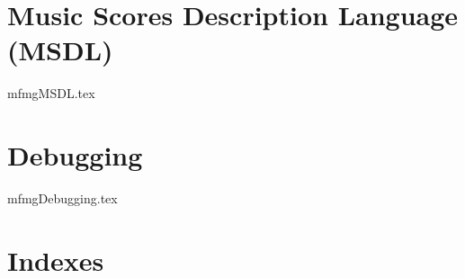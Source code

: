 \documentclass[11pt,a4paper]{report}
\begin{document}
\part{Music Scores Description Language (MSDL)}

{mfmgMSDL.tex}


\part{Debugging}

{mfmgDebugging.tex}



\part{Indexes}


\useListsPagesHeadersAndFooters

\printindex[Files]

\printindex[Types]
\printindex[MethodsAndFields]

\printindex[ConstantsFunctionsAndVariables]

\printindex[Options]

\printindex[MusicXML]

\printindex[Main]


\end{document}
